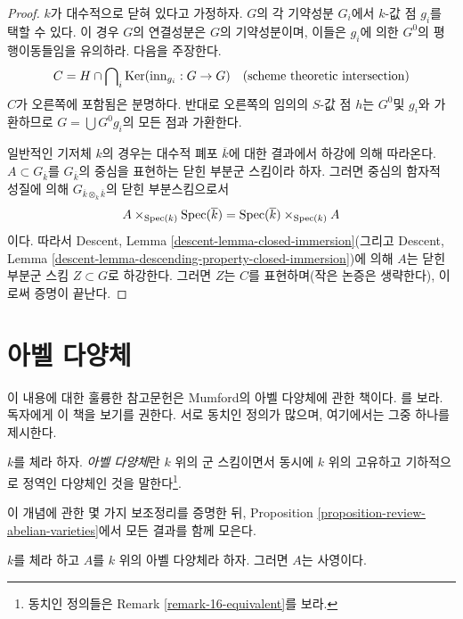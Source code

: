 \begin{proof}
\medskip\noindent
$k$가 대수적으로 닫혀 있다고 가정하자. $G$의 각 기약성분 $G_i$에서 $k$-값 점 $g_i$를 택할 수 있다.
이 경우 $G$의 연결성분은 $G$의 기약성분이며, 이들은 $g_i$에 의한 $G^0$의 평행이동들임을 유의하라.
다음을 주장한다.
$$
C = H \cap \bigcap\nolimits_i \mathop{\mathrm{Ker}}(\text{inn}_{g_i} : G \to G)
\quad (\text{scheme theoretic intersection})
$$
$C$가 오른쪽에 포함됨은 분명하다. 반대로 오른쪽의 임의의 $S$-값 점 $h$는 $G^0$및 $g_i$와 가환하므로
$G = \bigcup G^0g_i$의 모든 점과 가환한다.

\medskip\noindent
일반적인 기저체 $k$의 경우는 대수적 폐포 $\overline{k}$에 대한 결과에서 하강에 의해 따라온다.
$A \subset G_{\overline{k}}$를 $G_{\overline{k}}$의 중심을 표현하는 닫힌 부분군 스킴이라 하자. 그러면 중심의
함자적 성질에 의해 $G_{\overline{k} \otimes_k \overline{k}}$의 닫힌 부분스킴으로서
$$
A \times_{\mathop{\mathrm{Spec}}(k)} \mathop{\mathrm{Spec}}(\overline{k}) =
\mathop{\mathrm{Spec}}(\overline{k}) \times_{\mathop{\mathrm{Spec}}(k)} A
$$
이다. 따라서 Descent, Lemma \ref{descent-lemma-closed-immersion}(그리고 Descent, Lemma
\ref{descent-lemma-descending-property-closed-immersion})에 의해 $A$는 닫힌 부분군 스킴 $Z \subset G$로 하강한다.
그러면 $Z$는 $C$를 표현하며(작은 논증은 생략한다), 이로써 증명이 끝난다.
\end{proof}







\section{아벨 다양체}
\label{section-abelian-varieties}

\noindent
이 내용에 대한 훌륭한 참고문헌은 Mumford의 아벨 다양체에 관한 책이다. \cite{AVar}를 보라.
독자에게 이 책을 보기를 권한다. 서로 동치인 정의가 많으며, 여기에서는 그중 하나를 제시한다.

\begin{definition}
\label{definition-abelian-variety}
$k$를 체라 하자. {\it 아벨 다양체}란 $k$ 위의 군 스킴이면서 동시에 $k$ 위의 고유하고 기하적으로
정역인 다양체인 것을 말한다\footnote{동치인 정의들은 Remark \ref{remark-16-equivalent}를 보라.}.
\end{definition}

\noindent
이 개념에 관한 몇 가지 보조정리를 증명한 뒤, Proposition \ref{proposition-review-abelian-varieties}에서
모든 결과를 함께 모은다.

\begin{lemma}
\label{lemma-abelian-variety-projective}
$k$를 체라 하고 $A$를 $k$ 위의 아벨 다양체라 하자. 그러면 $A$는 사영이다.
\end{lemma}

